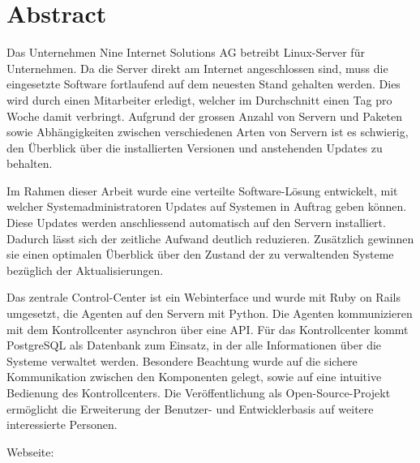 \begin{comment}
2.1.2 Abstract
Ein Abstract ist eine rein textuelle kurze Zusammenfassung der Arbeit. Der Abstract ist für die Recherche in grossen Dokumentensammlungen geeignet. Er umfasst nie mehr als eine Seite, typisch sogar nur etwa 200 Worte (etwa 20 Zeilen).
Der Begriff ‚Kurzfassung’ ist zuwenig genau definiert; er soll wenn möglich vermieden werden.


“Der Abstract richtet sich an den Spezialisten auf dem entsprechenden Gebiet und beschreibt daher in erster Linie die (neuen, eigenen) Ergebnisse und Resultate der Arbeit. Es umfasst nie mehr als eine Seite, typisch sogar nur etwa 200 Worte (etwa 20 Zeilen). Es sind keine Bilder zu verwenden.” (Anleitung: Dokumentation Studien- und Bachelorarbeiten)

Offene Fragen:
- Mehr zur Umsetzung?
- Nutzen für den obigen Mitarbeiter? Zeitersparnis, Überblick?

\end{comment}

{}
\chapter*{Abstract}

Das Unternehmen Nine Internet Solutions AG betreibt Linux-Server für Unternehmen. Da die Server direkt am Internet angeschlossen sind, muss die eingesetzte Software fortlaufend auf dem neuesten Stand gehalten werden. Dies wird durch einen Mitarbeiter erledigt, welcher im Durchschnitt einen Tag pro Woche damit verbringt. Aufgrund der grossen Anzahl von Servern und Paketen sowie Abhängigkeiten zwischen verschiedenen Arten von Servern ist es schwierig, den Überblick über die installierten Versionen und anstehenden Updates zu behalten.

Im Rahmen dieser Arbeit wurde eine verteilte Software-Lösung entwickelt, mit welcher Systemadministratoren Updates auf Systemen in Auftrag geben können. Diese Updates werden anschliessend automatisch auf den Servern installiert. Dadurch lässt sich der zeitliche Aufwand deutlich reduzieren. Zusätzlich gewinnen sie einen optimalen Überblick über den Zustand der zu verwaltenden Systeme bezüglich der Aktualisierungen.

Das zentrale Control-Center ist ein Webinterface und wurde mit Ruby on Rails umgesetzt, die Agenten auf den Servern mit Python. Die Agenten kommunizieren mit dem Kontrollcenter asynchron über eine API. Für das Kontrollcenter kommt PostgreSQL als Datenbank zum Einsatz, in der alle Informationen über die Systeme verwaltet werden. Besondere Beachtung wurde auf die sichere Kommunikation zwischen den Komponenten gelegt, sowie auf eine intuitive Bedienung des Kontrollcenters. Die Veröffentlichung als Open-Source-Projekt ermöglicht die Erweiterung der Benutzer- und Entwicklerbasis auf weitere interessierte Personen.

\bigskip
Webseite: 

\glsresetall
